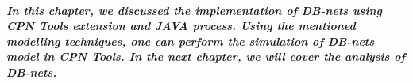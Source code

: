 \subparagraph*{\textnormal{In this chapter, we discussed the implementation of DB-nets using CPN Tools extension and JAVA process. Using the mentioned modelling techniques, one can perform the simulation of DB-nets model in CPN Tools. In the next chapter, we will cover the analysis of DB-nets.}}

%
%
%
